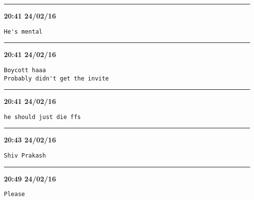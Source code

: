 \hrule%

\begin{adjustwidth}{0cm}{0cm}
\footnotesize \textbf{20:41 24/02/16}

\begin{lstlisting}[breaklines, breakatwhitespace, basicstyle=\small, frame=leftline]
He's mental
\end{lstlisting}
\end{adjustwidth}

\hrule%

\begin{adjustwidth}{0cm}{0cm}
\footnotesize \textbf{20:41 24/02/16}

\begin{lstlisting}[breaklines, breakatwhitespace, basicstyle=\small, frame=leftline]
Boycott haaa
Probably didn't get the invite
\end{lstlisting}
\end{adjustwidth}

\hrule%

\begin{adjustwidth}{0cm}{0cm}
\footnotesize \textbf{20:41 24/02/16}

\begin{lstlisting}[breaklines, breakatwhitespace, basicstyle=\small, frame=leftline]
he should just die ffs
\end{lstlisting}
\end{adjustwidth}

\hrule%

\begin{adjustwidth}{0cm}{0cm}
\footnotesize \textbf{20:43 24/02/16}

\begin{lstlisting}[breaklines, breakatwhitespace, basicstyle=\small, frame=leftline]
Shiv Prakash
\end{lstlisting}
\end{adjustwidth}

\hrule%

\begin{adjustwidth}{0cm}{0cm}
\footnotesize \textbf{20:49 24/02/16}

\begin{lstlisting}[breaklines, breakatwhitespace, basicstyle=\small, frame=leftline]
Please
\end{lstlisting}
\end{adjustwidth}

